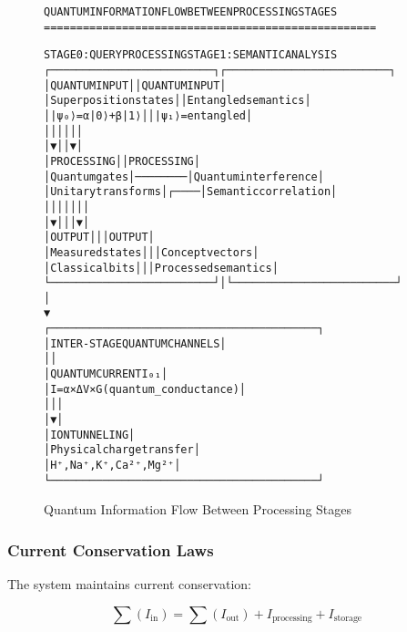\documentclass[11pt,a4paper]{article}
\newenvironment{asciiart}{\begin{alltt}}{\end{alltt}}
\begin{document}
\begin{figure}[H]
\centering
\begin{asciiart}
QUANTUM INFORMATION FLOW BETWEEN PROCESSING STAGES
===================================================

STAGE 0: QUERY PROCESSING           STAGE 1: SEMANTIC ANALYSIS
┌─────────────────────────┐        ┌─────────────────────────┐
│ QUANTUM INPUT           │        │ QUANTUM INPUT           │
│ Superposition states    │        │ Entangled semantics    │
│ |ψ₀⟩ = α|0⟩ + β|1⟩     │        │ |ψ₁⟩ = entangled      │
│          │              │        │          │              │
│          ▼              │        │          ▼              │
│ PROCESSING              │        │ PROCESSING              │
│ Quantum gates           │────────│ Quantum interference   │
│ Unitary transforms      │   ┌────│ Semantic correlation   │
│          │              │   │    │          │              │
│          ▼              │   │    │          ▼              │
│ OUTPUT                  │   │    │ OUTPUT                  │
│ Measured states         │   │    │ Concept vectors         │
│ Classical bits          │   │    │ Processed semantics     │
└─────────────────────────┘   │    └─────────────────────────┘
                              │
                              ▼
            ┌─────────────────────────────────────────┐
            │       INTER-STAGE QUANTUM CHANNELS      │
            │                                         │
            │  QUANTUM CURRENT I₀₁                   │
            │  I = α × ΔV × G(quantum_conductance)    │
            │               │                         │
            │               ▼                         │
            │  ION TUNNELING                         │
            │  Physical charge transfer               │
            │  H⁺, Na⁺, K⁺, Ca²⁺, Mg²⁺              │
            └─────────────────────────────────────────┘
\end{asciiart}
\caption{Quantum Information Flow Between Processing Stages}
\end{figure}

\subsubsection{Current Conservation Laws}

The system maintains current conservation:

\begin{equation}
\sum(I_{\text{in}}) = \sum(I_{\text{out}}) + I_{\text{processing}} + I_{\text{storage}}
\end{equation}
\end{document}

